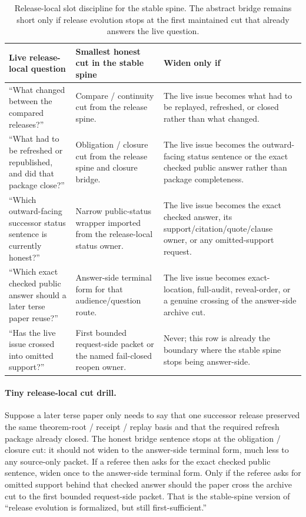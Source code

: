 \documentclass[11pt]{article}
\begin{document}
\begin{table}[t]
\centering
\small
\begin{tabularx}{\linewidth}{@{}L Y Y@{}}
\toprule
Live release-local question & Smallest honest cut in the stable spine & Widen only if \\
\midrule
``What changed between the compared releases?'' & Compare / continuity cut from the release spine. & The live issue becomes what had to be replayed, refreshed, or closed rather than what changed. \\
``What had to be refreshed or republished, and did that package close?'' & Obligation / closure cut from the release spine and closure bridge. & The live issue becomes the outward-facing status sentence or the exact checked public answer rather than package completeness. \\
``Which outward-facing successor status sentence is currently honest?'' & Narrow public-status wrapper imported from the release-local status owner. & The live issue becomes the exact checked answer, its support/citation/quote/clause owner, or any omitted-support request. \\
``Which exact checked public answer should a later terse paper reuse?'' & Answer-side terminal form for that audience/question route. & The live issue becomes exact-location, full-audit, reveal-order, or a genuine crossing of the answer-side archive cut. \\
``Has the live issue crossed into omitted support?'' & First bounded request-side packet or the named fail-closed reopen owner. & Never; this row is already the boundary where the stable spine stops being answer-side. \\
\bottomrule
\end{tabularx}
\caption{Release-local slot discipline for the stable spine. The abstract bridge remains short only if release evolution stops at the first maintained cut that already answers the live question.}
\label{tab:seriesspine-release-slot-cut-card}
\end{table}

\paragraph{Tiny release-local cut drill.}
Suppose a later terse paper only needs to say that one successor release preserved the same theorem-root / receipt / replay basis and that the required refresh package already closed. The honest bridge sentence stops at the obligation / closure cut: it should not widen to the answer-side terminal form, much less to any source-only packet. If a referee then asks for the exact checked public sentence, widen once to the answer-side terminal form. Only if the referee asks for omitted support behind that checked answer should the paper cross the archive cut to the first bounded request-side packet. That is the stable-spine version of ``release evolution is formalized, but still first-sufficient.''\cite{series:releasespine,series:workedexample,series:pairedterminalcutoverrules}
\end{document}
